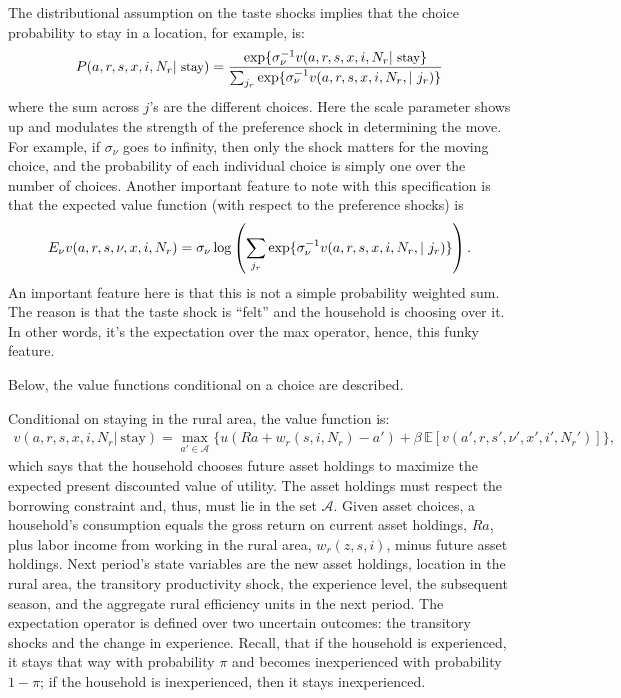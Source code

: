 \documentclass[pdftex,11pt]{article}
\begin{document}
The distributional assumption on the taste shocks implies that the choice probability to stay in a location, for example, is:
\begin{eqnarray*}
\small
P(a, r, s, x, i, N_r| \ \mbox{stay}) = \frac{\exp\{\sigma_{\nu}^{-1} v(a, r,  s, x, i, N_r | \ \mbox{stay}\}}{\sum_{j_r} \exp\{\sigma_{\nu}^{-1} v(a, r,  s, x, i, N_r, | \ j_r)\}}
\end{eqnarray*}
where the sum across $j$'s are the different choices. Here the scale parameter shows up and modulates the strength of the preference shock in determining the move. For example, if $\sigma_{\nu}$ goes to infinity, then only the shock matters for the moving choice, and the probability of each individual choice is simply one over the number of choices. Another important feature to note with this specification is that the expected value function (with respect to the preference shocks) is
\begin{eqnarray*}
\small
E_{\nu} v(a, r, s, \nu, x, i, N_r) = \sigma_{\nu} \log \left( \sum_{j_r} \exp\{\sigma_{\nu}^{-1} v(a, r,  s, x, i, N_r, | \ j_r)\} \right).
\end{eqnarray*}
An important feature here is that this is not a simple probability weighted sum. The reason is that the taste shock is ``felt'' and the household is choosing over it. In other words, it's the expectation over the max operator, hence, this funky feature.

Below, the value functions conditional on a choice are described. 

Conditional on staying in the rural area, the value function is:
\begin{align}
v(a, r, s, x, i, N_r | \ \mbox{stay}) =  \max_{a'\in \mathcal{A}}\bigg  \{ u(Ra + w_{r}(s, i, N_r) - a' )  + \beta \, \mathbb{E} [v(a',r, s',\nu', x',i',N_r')]  \bigg\},
\label{eq:bellman_rural_stay}
\end{align}
which says that the household chooses future asset holdings to maximize the expected present discounted value of utility. The asset holdings must respect the borrowing constraint and, thus, must lie in the set $\mathcal{A}$. Given asset choices, a household's consumption equals the gross return on current asset holdings, $Ra$, plus labor income from working in the rural area, $w_{r}(z, s, i)$, minus future asset holdings. Next period's state variables are the new asset holdings, location in the rural area, the transitory productivity shock, the experience level, the subsequent season, and the aggregate rural efficiency units in the next period. The expectation operator is defined over two uncertain outcomes: the transitory shocks and the change in experience. Recall, that if the household is experienced, it stays that way with probability $\pi$ and becomes inexperienced with probability $1-\pi$; if the household is inexperienced, then it stays inexperienced.
\end{document}
